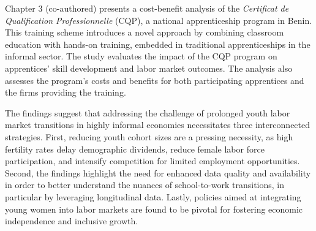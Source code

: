 Chapter 3 (co-authored) presents a cost-benefit analysis of the \textit{Certificat de Qualification Professionnelle} (CQP), a national apprenticeship program in Benin. This training scheme introduces a novel approach by combining classroom education with hands-on training, embedded in traditional apprenticeships in the informal sector. The study evaluates the impact of the CQP program on apprentices' skill development and labor market outcomes. The analysis also assesses the program's costs and benefits for both participating apprentices and the firms providing the training.

The findings suggest that addressing the challenge of prolonged youth labor market transitions in highly informal economies necessitates three interconnected strategies. First, reducing youth cohort sizes are a pressing necessity, as high fertility rates delay demographic dividends, reduce female labor force participation, and intensify competition for limited employment opportunities. Second, the findings highlight the need for enhanced data quality and availability in order to better understand the nuances of school-to-work transitions, in particular by leveraging longitudinal data. Lastly, policies aimed at integrating young women into labor markets are found to be pivotal for fostering economic independence and inclusive growth.



